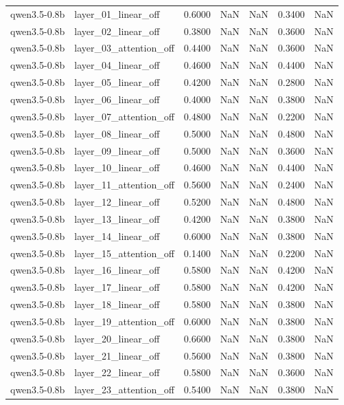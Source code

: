 \begin{tabular}{llrrrrr}
qwen3.5-0.8b & layer_01_linear_off & 0.6000 & NaN & NaN & 0.3400 & NaN \\
qwen3.5-0.8b & layer_02_linear_off & 0.3800 & NaN & NaN & 0.3600 & NaN \\
qwen3.5-0.8b & layer_03_attention_off & 0.4400 & NaN & NaN & 0.3600 & NaN \\
qwen3.5-0.8b & layer_04_linear_off & 0.4600 & NaN & NaN & 0.4400 & NaN \\
qwen3.5-0.8b & layer_05_linear_off & 0.4200 & NaN & NaN & 0.2800 & NaN \\
qwen3.5-0.8b & layer_06_linear_off & 0.4000 & NaN & NaN & 0.3800 & NaN \\
qwen3.5-0.8b & layer_07_attention_off & 0.4800 & NaN & NaN & 0.2200 & NaN \\
qwen3.5-0.8b & layer_08_linear_off & 0.5000 & NaN & NaN & 0.4800 & NaN \\
qwen3.5-0.8b & layer_09_linear_off & 0.5000 & NaN & NaN & 0.3600 & NaN \\
qwen3.5-0.8b & layer_10_linear_off & 0.4600 & NaN & NaN & 0.4400 & NaN \\
qwen3.5-0.8b & layer_11_attention_off & 0.5600 & NaN & NaN & 0.2400 & NaN \\
qwen3.5-0.8b & layer_12_linear_off & 0.5200 & NaN & NaN & 0.4800 & NaN \\
qwen3.5-0.8b & layer_13_linear_off & 0.4200 & NaN & NaN & 0.3800 & NaN \\
qwen3.5-0.8b & layer_14_linear_off & 0.6000 & NaN & NaN & 0.3800 & NaN \\
qwen3.5-0.8b & layer_15_attention_off & 0.1400 & NaN & NaN & 0.2200 & NaN \\
qwen3.5-0.8b & layer_16_linear_off & 0.5800 & NaN & NaN & 0.4200 & NaN \\
qwen3.5-0.8b & layer_17_linear_off & 0.5800 & NaN & NaN & 0.4200 & NaN \\
qwen3.5-0.8b & layer_18_linear_off & 0.5800 & NaN & NaN & 0.3800 & NaN \\
qwen3.5-0.8b & layer_19_attention_off & 0.6000 & NaN & NaN & 0.3800 & NaN \\
qwen3.5-0.8b & layer_20_linear_off & 0.6600 & NaN & NaN & 0.3800 & NaN \\
qwen3.5-0.8b & layer_21_linear_off & 0.5600 & NaN & NaN & 0.3800 & NaN \\
qwen3.5-0.8b & layer_22_linear_off & 0.5800 & NaN & NaN & 0.3600 & NaN \\
qwen3.5-0.8b & layer_23_attention_off & 0.5400 & NaN & NaN & 0.3800 & NaN \\

\end{tabular}
